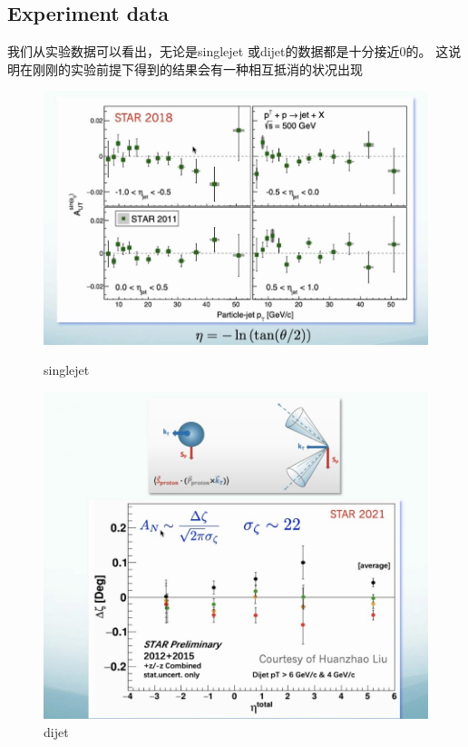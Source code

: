 \documentclass[12pt, a4paper, oneside]{ctexart}
\begin{document}
\begin{spacing}{2.0}
\subsection{Experiment data}
我们从实验数据可以看出，无论是singlejet 或dijet的数据都是十分接近0的。
这说明在刚刚的实验前提下得到的结果会有一种相互抵消的状况出现
\begin{figure}
    \begin{minipage}[t]{0.5\linewidth}
        \centering
        \includegraphics[scale=0.3]{alpha.jpg}
        \caption{singlejet}
        \label{fig:side:a}
      \end{minipage}%
      \begin{minipage}[t]{0.5\linewidth}
        \centering
        \includegraphics[scale=0.3]{dijet.jpg}
        \caption{dijet}
        \label{fig:side:b}
      \end{minipage}
 

\end{figure}
\end{spacing}
\end{document}

